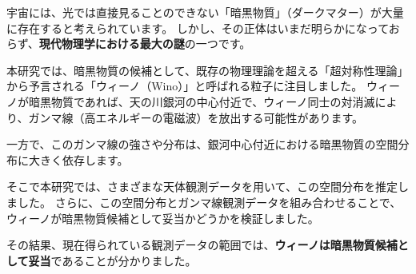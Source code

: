 宇宙には、光では直接見ることのできない「暗黒物質」（ダークマター）が大量に存在すると考えられています。
しかし、その正体はいまだ明らかになっておらず、\textbf{現代物理学における最大の謎}の一つです。

本研究では、暗黒物質の候補として、既存の物理理論を超える「超対称性理論」から予言される「ウィーノ（Wino）」と呼ばれる粒子に注目しました。
ウィーノが暗黒物質であれば、天の川銀河の中心付近で、ウィーノ同士の対消滅により、ガンマ線（高エネルギーの電磁波）を放出する可能性があります。

一方で、このガンマ線の強さや分布は、銀河中心付近における暗黒物質の空間分布に大きく依存します。

そこで本研究では、さまざまな天体観測データを用いて、この空間分布を推定しました。
さらに、この空間分布とガンマ線観測データを組み合わせることで、ウィーノが暗黒物質候補として妥当かどうかを検証しました。

その結果、現在得られている観測データの範囲では、\textbf{ウィーノは暗黒物質候補として妥当}であることが分かりました。
